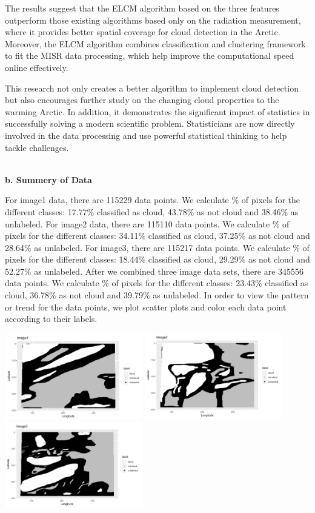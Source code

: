 \documentclass[11pt]{article}
\begin{document}
The results suggest that the ELCM algorithm based on the three features outperform those existing algorithms based only on the radiation measurement, where it provides better spatial coverage for cloud detection in the Arctic. Moreover, the ELCM algorithm combines classification and clustering framework to fit the MISR data processing, which help improve the computational speed online effectively. 

This research not only creates a better algorithm to implement cloud detection but also encourages further study on the changing cloud properties to the warming Arctic. In addition, it demonstrates the significant impact of statistics in successfully solving a modern scientific problem. Statisticians are now directly involved in the data processing and use powerful statistical thinking to help tackle challenges. \par

\vspace{0.3cm}
\mbox{}\\
\textbf{b. Summery of Data}

For image1 data, there are 115229 data points. We calculate \% of pixels for the different classes: 17.77\% classified as cloud, 43.78\% as not cloud and 38.46\% as unlabeled. For image2 data, there are 115110 data points. We calculate \% of pixels for the different classes: 34.11\% classified as cloud, 37.25\% as not cloud and 28.64\% as unlabeled. For image3, there are 115217 data points. We calculate \% of pixels for the different classes: 18.44\% classified as cloud, 29.29\% as not cloud and 52.27\% as unlabeled. After we combined three image data sets, there are 345556 data points. We calculate \% of pixels for the different classes: 23.43\% classified as cloud, 36.78\% as not cloud and 39.79\% as unlabeled. 
In order to view the pattern or trend for the data points, we plot scatter plots and color each data point according to their labels. 


\includegraphics[width = 6cm]{1(b)image1.png}
\includegraphics[width = 6cm]{1(b)image2.png}
\includegraphics[width = 6cm]{1(b)image3.png}
\end{document}
